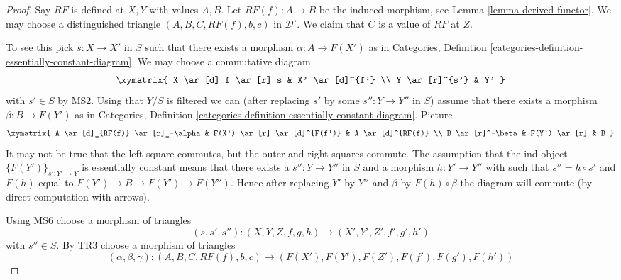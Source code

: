 \begin{proof}
Say $RF$ is defined at $X, Y$ with values $A, B$.
Let $RF(f) : A \to B$ be the induced morphism, see
Lemma \ref{lemma-derived-functor}.
We may choose a distinguished triangle
$(A, B, C, RF(f), b, c)$
in $\mathcal{D}'$. We claim that $C$ is a value of $RF$ at $Z$.

\medskip\noindent
To see this pick $s : X \to X'$ in $S$ such that there exists a morphism
$\alpha : A \to F(X')$ as in
Categories,
Definition \ref{categories-definition-essentially-constant-diagram}.
We may choose a commutative diagram
$$
\xymatrix{
X \ar[d]_f \ar[r]_s & X' \ar[d]^{f'} \\
Y \ar[r]^{s'} & Y'
}
$$
with $s' \in S$ by MS2. Using that $Y/S$ is filtered we can (after replacing
$s'$ by some $s'' : Y \to Y''$ in $S$) assume that there exists
a morphism $\beta : B \to F(Y')$ as in
Categories,
Definition \ref{categories-definition-essentially-constant-diagram}.
Picture
$$
\xymatrix{
A \ar[d]_{RF(f)} \ar[r]_-\alpha &
F(X') \ar[r] \ar[d]^{F(f')} &
A \ar[d]^{RF(f)} \\
B \ar[r]^-\beta & F(Y') \ar[r] & B
}
$$
It may not be true that the left square commutes, but the outer and
right squares commute.
The assumption that the ind-object $\{F(Y')\}_{s' : Y' \to Y}$
is essentially constant means that there exists a $s'' : Y \to Y''$
in $S$ and a morphism $h : Y' \to Y''$ with such that $s'' = h \circ s'$ and
$F(h)$ equal to $F(Y') \to B \to F(Y') \to F(Y'')$. Hence
after replacing $Y'$ by $Y''$ and $\beta$ by $F(h) \circ \beta$ the
diagram will commute (by direct computation with arrows).

\medskip\noindent
Using MS6 choose a morphism of triangles
$$
(s, s', s'') : (X, Y, Z, f, g, h) \longrightarrow (X', Y', Z', f', g', h')
$$
with $s'' \in S$. By TR3 choose a morphism of triangles
$$
(\alpha, \beta, \gamma) :
(A, B, C, RF(f), b, c)
\longrightarrow
(F(X'), F(Y'), F(Z'), F(f'), F(g'), F(h'))
$$


\end{proof}
